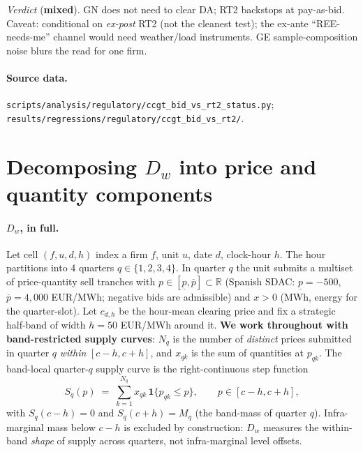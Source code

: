 \documentclass[11pt,a4paper]{article}
\newcommand{\code}[1]{\nolinkurl{#1}}
\begin{document}
\textit{Verdict} (\textbf{mixed}). GN does not need to clear DA; RT2 backstops at pay-as-bid. Caveat: conditional on \emph{ex-post} RT2 (not the cleanest test); the ex-ante ``REE-needs-me'' channel would need weather/load instruments. GE sample-composition noise blurs the read for one firm.

\paragraph{Source data.} \code{scripts/analysis/regulatory/ccgt_bid_vs_rt2_status.py};
\code{results/regressions/regulatory/ccgt_bid_vs_rt2/}.


\section{Decomposing $D_w$ into price and quantity components}\label{sec:prov:dw_decomp}

\paragraph{$D_w$, in full.}
Let cell $(f, u, d, h)$ index a firm $f$, unit $u$, date $d$, clock-hour $h$. The hour partitions into 4 quarters $q \in \{1,2,3,4\}$. In quarter $q$ the unit submits a multiset of price-quantity sell tranches with $p\in[\underline p, \overline p] \subset \mathbb{R}$ (Spanish SDAC: $\underline p = -500$, $\overline p = 4{,}000$ EUR/MWh; negative bids are admissible) and $x>0$ (MWh, energy for the quarter-slot). Let $c_{d,h}$ be the hour-mean clearing price and fix a strategic half-band of width $h = 50$ EUR/MWh around it. \textbf{We work throughout with band-restricted supply curves}: $N_q$ is the number of \emph{distinct} prices submitted in quarter $q$ \emph{within} $[c-h, c+h]$, and $x_{qk}$ is the sum of quantities at $p_{qk}$. The band-local quarter-$q$ supply curve is the right-continuous step function
\[
  S_q(p) \;=\; \sum_{k=1}^{N_q} x_{qk}\,\mathbf{1}\{p_{qk}\le p\}, \qquad p \in [c-h, c+h],
\]
with $S_q(c-h) = 0$ and $S_q(c+h) = M_q$ (the band-mass of quarter $q$). Infra-marginal mass below $c-h$ is excluded by construction: $D_w$ measures the within-band \emph{shape} of supply across quarters, not infra-marginal level offsets.
\end{document}
